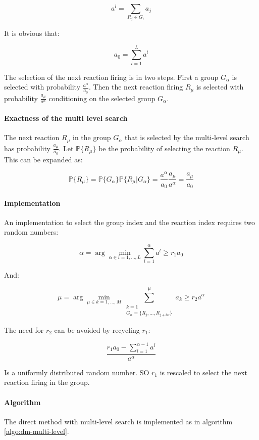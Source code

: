     $$a^l = \sum\limits_{R_j\in G_l}a_j$$

    It is obvious that:

    $$a_0 = \sum\limits_{l=1}^L a^l$$

    The selection of the next reaction firing is in two steps.
    First a group $G_\alpha$ is selected with probability $\frac{a^\alpha}{a_0}$.
    Then the next reaction firing $R_\mu$ is selected with probability $\frac{a_\mu}{a^\alpha}$ conditioning on the selected group $G_\alpha$.

      \paragraph{Exactness of the multi level search}
      The next reaction $R_\mu$ in the group $G_\alpha$ that is selected by the multi-level search has probability $\frac{a_\mu}{a_0}$.
      Let $\mathbb{P}\{R_\mu\}$ be the probability of selecting the reaction $R_\mu$.
      This can be expanded as:

      $$\mathbb{P}\{R_\mu\} = \mathbb{P}\{G_\alpha\}\mathbb{P}\{R_\mu|G_\alpha\} = \frac{a^\alpha}{a_0}\frac{a_\mu}{a^\alpha} = \frac{a_\mu}{a_0}$$

      \paragraph{Implementation}
      An implementation to select the group index and the reaction index requires two random numbers:

      $$\alpha = \arg\min\limits_{\alpha\in l = 1, \dots, L}\sum\limits_{l=1}^\alpha a^l\ge r_1a_0$$

      And:

      $$\mu = \arg\min\limits_{\mu\in k = 1, \dots, M}\sum\limits_{\substack{k=1\\G_\alpha = \{R_j, \dots, R_{j+k\alpha}\}}}^\mu a_k\ge r_2 a^\alpha$$

      The need  for $r_2$ can be avoided by recycling $r_1$:

      $$\frac{r_1 a_0 -\sum\limits_{l=1}^{\alpha-1}a^l}{a^\alpha}$$

      Is a uniformly distributed random number.
      SO $r_1$ is rescaled to select the next reaction firing in the group.

      \paragraph{Algorithm}
      The direct method with multi-level search is implemented as in algorithm \ref{algo:dm-multi-level}.

